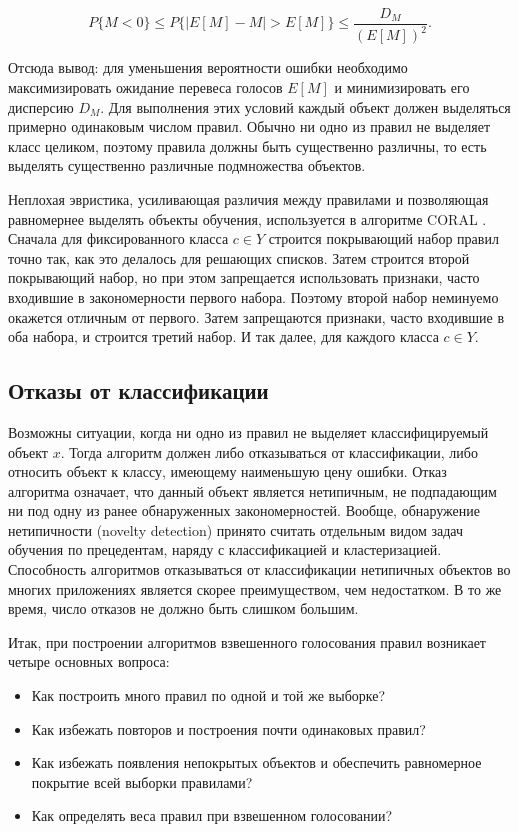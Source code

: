 \[
    P\{M < 0\} \leq P\{|E[M] - M| > E[M]\} \leq \frac{D_M}{(E[M])^2}.
\]

Отсюда вывод: для уменьшения вероятности ошибки необходимо максимизировать ожидание перевеса голосов $E[M]$ и минимизировать его дисперсию $D_M$. Для выполнения этих условий каждый объект должен выделяться примерно одинаковым числом правил. Обычно ни одно из правил не выделяет класс целиком, поэтому правила должны быть существенно различны, то есть выделять существенно различные подмножества объектов.

Неплохая эвристика, усиливающая различия между правилами и позволяющая равномернее выделять объекты обучения, используется в алгоритме CORAL \cite{12}. Сначала для фиксированного класса $c \in Y$ строится покрывающий набор правил точно так, как это делалось для решающих списков. Затем строится второй покрывающий набор, но при этом запрещается использовать признаки, часто входившие в закономерности первого набора. Поэтому второй набор неминуемо окажется отличным от первого. Затем запрещаются признаки, часто входившие в оба набора, и строится третий набор. И так далее, для каждого класса $c \in Y$.

\subsection{Отказы от классификации}
Возможны ситуации, когда ни одно из правил не выделяет классифицируемый объект $x$. Тогда алгоритм должен либо отказываться от классификации, либо относить объект к классу, имеющему наименьшую цену ошибки. Отказ алгоритма означает, что данный объект является нетипичным, не подпадающим ни под одну из ранее обнаруженных закономерностей. Вообще, обнаружение нетипичности (novelty detection) принято считать отдельным видом задач обучения по прецедентам, наряду с классификацией и кластеризацией. Способность алгоритмов отказываться от классификации нетипичных объектов во многих приложениях является скорее преимуществом, чем недостатком. В то же время, число отказов не должно быть слишком большим.

Итак, при построении алгоритмов взвешенного голосования правил возникает четыре основных вопроса:
\begin{itemize}
    \item Как построить много правил по одной и той же выборке?
    \item Как избежать повторов и построения почти одинаковых правил?
    \item Как избежать появления непокрытых объектов и обеспечить равномерное покрытие всей выборки правилами?
    \item Как определять веса правил при взвешенном голосовании?
\end{itemize}


